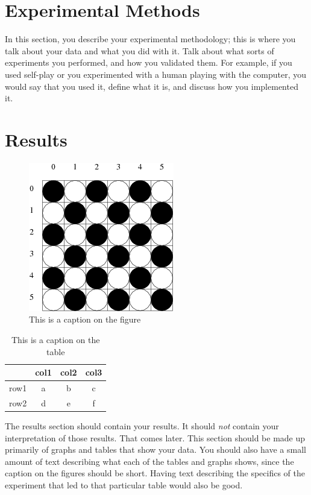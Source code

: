 \documentclass[12pt,letterpaper]{article}
\begin{document}
\section{Experimental Methods}

In this section, you describe your experimental methodology; this is where you talk
about your data and what you did with it.  Talk about what sorts of experiments
you performed, and how you validated them.  For example, if you used self-play
or you experimented with a human playing with the computer, you would say that 
you used it, define what it is, and discuss
how you implemented it.  

\section{Results}
\begin{figure}
\begin{center}
\includegraphics[width=2.5in]{konane1.png}
\end{center}
\caption{This is a caption on the figure}
\label{somefigure}
\end{figure}

\begin{table}
\begin{center}
\begin{tabular}{|c||c|c|c|}
\hline
& col1 & col2 & col3\\
\hline \hline
row1 & a & b & c\\
\hline 
row2 & d & e & f\\
\hline 
\end{tabular}
\end{center}
\caption{This is a caption on the table}
\label{sometable}
\end{table}

The results section should contain your results.  It should \emph{not} contain
your interpretation of those results.  That comes later.  This section should be
made up primarily of graphs and tables that show your data.  You should also
have a small amount of text describing what each of the tables and graphs shows,
since the caption on the figures should be short.  Having text describing the
specifics of the experiment that led to that particular table would also be
good.  
\end{document}
